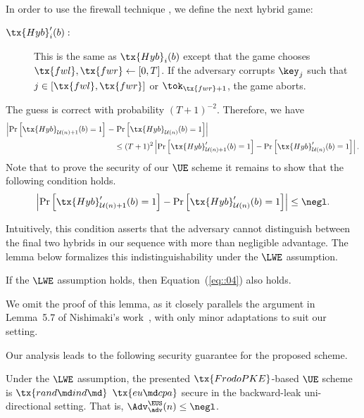\documentclass{fundam}
\begin{document}
In order to use the firewall technique \cite{jiang2020,nishimaki2022direction}, we define the next hybrid game:
\begin{description}
	\item[$\tx{Hyb}_{i}'(b):$] This is the same as $\tx{Hyb}_{i}(b)$ except that the game chooses $\tx{fwl},\tx{fwr}\gets [0,T]$. If the adversary corrupts $\key_{j}$ such that $j\in[\tx{fwl},\tx{fwr}]$ or $\tok_{\tx{fwr}+1}$, the game aborts.
\end{description}
The guess is correct with probability $(T+1)^{-2}$. Therefore, we have
%
\begin{align*}
	\left|  \Pr\left[   \tx{Hyb}_{\mathcal{U}(n)+1}(b)=1\right]\right. - & \left. \Pr\left[   \tx{Hyb}_{\mathcal{U}(n)}(b)=1  \right]  \right| \\
	&\leq (T+1)^{2}	\left|  \Pr\left[   \tx{Hyb}_{\mathcal{U}(n)+1}'(b)=1\right] - \Pr\left[   \tx{Hyb}_{\mathcal{U}(n)}'(b)=1  \right]  \right|.
\end{align*}
%
Note that to prove the security of our $\UE$ scheme it remains to show that the following condition holds.  
\begin{align}\label{eq::04}
	\left|  \Pr\left[   \tx{Hyb}_{\mathcal{U}(n)+1}'(b)=1\right] - \Pr\left[   \tx{Hyb}_{\mathcal{U}(n)}'(b)=1  \right]  \right|\leq \negl.
\end{align}

\noindent
Intuitively, this condition asserts that the adversary cannot distinguish between the final two hybrids in our sequence with more than negligible advantage. The lemma below formalizes this indistinguishability under the $\LWE$ assumption.
\begin{lemma}
	If the $\LWE$ assumption holds, then Equation~(\ref{eq::04}) also holds.
\end{lemma}
%
We omit the proof of this lemma, as it closely parallels the argument in Lemma~5.7 of Nishimaki’s work~\cite{nishimaki2022direction}, with only minor adaptations to suit our setting.

\eject

Our analysis leads to the following security guarantee for the proposed scheme.
\begin{theorem}\label{th::main::one}
	Under the $\LWE$ assumption, the presented $\tx{FrodoPKE}$-based $\UE$ scheme is $\tx{rand\md ind\md}$ $\tx{eu\md cpa}$	secure in the backward-leak uni-directional setting. That is, $\Adv_{\adv}^{\EUS}(n) \leq \negl$. 
\end{theorem}	
\end{document}
